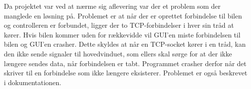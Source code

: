 Da projektet var ved at nærme sig aflevering var der et problem som der manglede en løsning på. Problemet er at når der er oprettet forbindelse til bilen og controlleren er forbundet, ligger der to TCP-forbindelser i hver sin tråd at kører. Hvis bilen kommer uden for rækkevidde vil GUI’en miste forbindelsen til bilen og GUI’en crasher. Dette skyldes at når en TCP-socket kører i en tråd, kan den ikke sende signaler til hovedvinduet, som ellers skal sørge for at der ikke længere sendes data, når forbindelsen er tabt. Programmet crasher derfor når det skriver til en forbindelse som ikke længere eksisterer. Problemet er også beskrevet i dokumentationen.